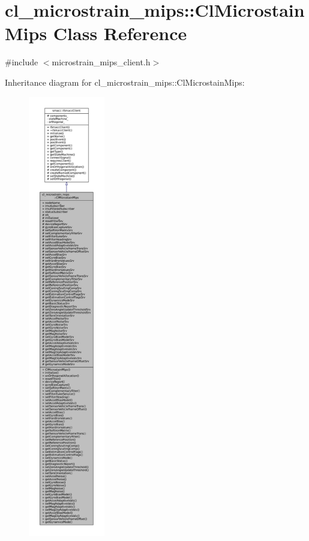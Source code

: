 \hypertarget{classcl__microstrain__mips_1_1ClMicrostainMips}{}\section{cl\+\_\+microstrain\+\_\+mips\+:\+:Cl\+Microstain\+Mips Class Reference}
\label{classcl__microstrain__mips_1_1ClMicrostainMips}


{\ttfamily \#include $<$microstrain\+\_\+mips\+\_\+client.\+h$>$}



Inheritance diagram for cl\+\_\+microstrain\+\_\+mips\+:\+:Cl\+Microstain\+Mips\+:
\nopagebreak
\begin{figure}[H]
\begin{center}
\leavevmode
\includegraphics[height=550pt]{classcl__microstrain__mips_1_1ClMicrostainMips__inherit__graph}
\end{center}
\end{figure}


